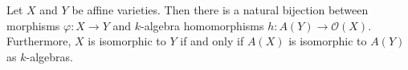 Let $X$ and $Y$ be affine varieties. Then there is a natural bijection between morphisms $\varphi: X \to Y$ and $k$-algebra homomorphisms $h: A(Y) \to \mathcal{O}(X)$. Furthermore, $X$ is isomorphic to $Y$ if and only if $A(X)$ is isomorphic to $A(Y)$ as $k$-algebras.
